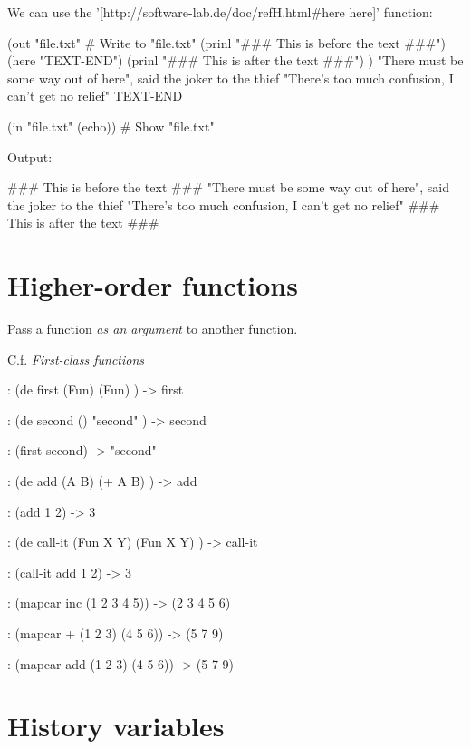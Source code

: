 \begin{itemize}
\begin{wideverbatim}

We can use the '[http://software-lab.de/doc/refH.html#here here]' function:

(out "file.txt"                        # Write to "file.txt"
   (prinl "### This is before the text ###")
   (here "TEXT-END")
   (prinl "### This is after the text ###") )
"There must be some way out of here", said the joker to the thief
"There's too much confusion, I can't get no relief"
TEXT-END

(in "file.txt" (echo))                 # Show "file.txt"

Output:

### This is before the text ###
"There must be some way out of here", said the joker to the thief
"There's too much confusion, I can't get no relief"
### This is after the text ###

\end{wideverbatim}

\pagebreak{}
\section*{Higher-order functions}

Pass a function \emph{as an argument} to another function.

C.f. \emph{First-class functions}


\begin{wideverbatim}

: (de first (Fun)
   (Fun) )
-> first

: (de second ()
   "second" )
-> second

: (first second)
-> "second"

: (de add (A B)
   (+ A B) )
-> add

: (add 1 2)
-> 3

: (de call-it (Fun X Y)
   (Fun X Y) )
-> call-it

: (call-it add 1 2)
-> 3

: (mapcar inc (1 2 3 4 5))
-> (2 3 4 5 6)

: (mapcar + (1 2 3) (4 5 6))
-> (5 7 9)

:  (mapcar add (1 2 3) (4 5 6))
-> (5 7 9)

\end{wideverbatim}

\pagebreak{}
\section*{History variables}


\end{itemize}
